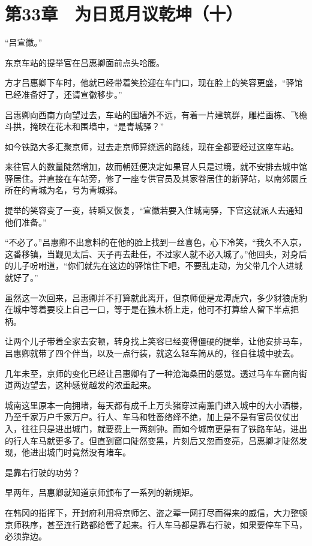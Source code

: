 \section{第33章　为日觅月议乾坤（十）}

“吕宣徽。”

东京车站的提举官在吕惠卿面前点头哈腰。

方才吕惠卿下车时，他就已经带着笑脸迎在车门口，现在脸上的笑容更盛，“驿馆已经准备好了，还请宣徽移步。”

吕惠卿向西南方向望过去，车站的围墙外不远，有着一片建筑群，雕栏画栋、飞檐斗拱，掩映在花木和围墙中，“是青城驿？”

如今铁路大多汇聚京师，过去走京师算绕远的路线，现在全都要经过这座车站。

来往官人的数量陡然增加，故而朝廷便决定如果官人只是过境，就不安排去城中馆驿居住。并直接在车站旁，修了一座专供官员及其家眷居住的新驿站，以南郊圜丘所在的青城为名，号为青城驿。

提举的笑容变了一变，转瞬又恢复，“宣徽若要入住城南驿，下官这就派人去通知他们准备。”

“不必了。”吕惠卿不出意料的在他的脸上找到一丝喜色，心下冷笑，“我久不入京，这番移镇，当觐见太后、天子再去赴任，不过家人就不必入城了。”他回头，对身后的儿子吩咐道，“你们就先在这边的驿馆住下吧，不要乱走动，为父带几个人进城就好了。”

虽然这一次回来，吕惠卿并不打算就此离开，但京师便是龙潭虎穴，多少豺狼虎豹在城中等着要咬上自己一口，等于是在独木桥上走，他可不打算给人留下半点把柄。

让两个儿子带着全家去安顿，转身找上笑容已经变得僵硬的提举，让他安排马车，吕惠卿就带了四个伴当，以及一点行装，就这么轻车简从的，径自往城中驶去。

几年未至，京师的变化已经让吕惠卿有了一种沧海桑田的感觉。透过马车车窗向街道两边望去，这种感觉越发的浓重起来。

城南这里原本一向拥堵，每天都有成千上万头猪穿过南薰门进入城中的大小酒楼，乃至千家万户千家万户。行人、车马和牲畜络绎不绝，加上是不是有官员仪仗出入，往往只是进出城门，就要费上一两刻钟。而如今城南更是有了铁路车站，进出的行人车马就更多了。但直到窗口陡然变黑，片刻后又忽而变亮，吕惠卿才陡然发现，他进出城门时竟然没有堵车。

是靠右行驶的功劳？

早两年，吕惠卿就知道京师颁布了一系列的新规矩。

在韩冈的指挥下，开封府利用将京师乞、盗之辈一网打尽而得来的威信，大力整顿京师秩序，甚至连行路都给管了起来。行人车马都是靠右行驶，如果要停车下马，必须靠边。

